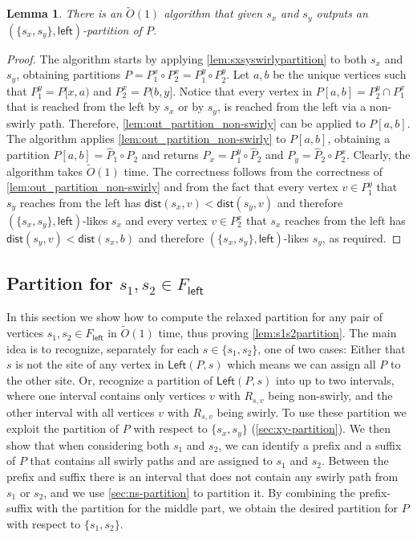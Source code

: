 \documentclass{article}
\newcommand{\Left}{\mathsf{Left}}
\newcommand{\leftside}{\mathsf{left}}
\newcommand{\dist}{\mathsf{dist}}
\newtheorem{lemma}{Lemma}
\newcommand{\Otild}{\tilde{O}}
\begin{document}
\begin{lemma}\label{lem:out_partition_xy}
    There is an $\Otild(1)$ algorithm that given $s_x$ and $s_y$ outputs an $(\{ s_x,s_y \},\leftside)$-partition of $P$.
\end{lemma}
\begin{proof}
    The algorithm starts by applying \cref{lem:sxsyswirlypartition} to both $s_x$ and $s_y$, obtaining partitions $P= P^x_1 \circ P^x_2 = P^y_1 \circ P^y_2$.
    Let $a,b$ be the unique vertices such that $P^y_1=P[x,a)$ and $P^x_2 = P(b,y]$.
    Notice that every vertex in $P[a,b]=P^y_2 \cap P^x_1$ that is reached from the left by $s_x$ or by $s_y$, is reached from the left via a non-swirly path.
    Therefore, \cref{lem:out_partition_non-swirly} can be applied to $P[a,b]$.
    The algorithm applies \cref{lem:out_partition_non-swirly} to $P[a,b]$, obtaining a partition $P[a,b] = \hat P_1 \circ \hat P_2$ and returns $P_x = P^y_1 \circ \hat P_2$
    and $P_y = \hat P_2 \circ P^x_2$.
    Clearly, the algorithm takes $\Otild(1)$ time.
    The correctness follows from the correctness of \cref{lem:out_partition_non-swirly} and from the fact that every vertex $v\in P^y_1$ that $s_y$ reaches from the left has $\dist(s_x,v) < \dist(s_y,v)$ and therefore $(\{s_x,s_y\},\leftside)$-likes $s_x$ and every vertex $v\in P^x_2$ that $s_x$ reaches from the left has $\dist(s_y,v) < \dist(s_x,b)$ and therefore $(\{s_x,s_y\},\leftside)$-likes $s_y$, as required.
\end{proof}




\subsection{Partition for $s_1,s_2\in F_{\leftside}$}\label{sec:two-partition}

In this section we show how to compute the relaxed partition for any pair of vertices $s_1,s_2\in F_{\leftside}$ in $\Otild(1)$ time, thus proving \cref{lem:s1s2partition}.
The main idea is to recognize, separately for each $s\in \{s_1,s_2\}$, one of two cases: Either that $s$ is not the site of any vertex in $\Left(P,s)$ which means we can assign all $P$ to the other site.
Or, recognize a partition of $\Left(P,s)$ into up to two intervals, where one interval contains only vertices $v$ with $R_{s,v}$ being non-swirly, and the other interval with all vertices $v$ with $R_{s,v}$  being swirly.
To use these partition we exploit the partition of $P$ with respect to $\{s_x,s_y\}$ (\cref{sec:xy-partition}).
We then show that when considering both $s_1$ and $s_2$, we can identify a prefix and a suffix of $P$ that contains all swirly paths and are assigned to $s_1$ and $s_2$.
Between the prefix and suffix there is an interval that does not contain any swirly path from $s_1$ or $s_2$, and we use \cref{sec:ns-partition} to partition it.
By combining the prefix-suffix with the partition for the middle part, we obtain the desired partition for $P$ with respect to $\{s_1,s_2\}$.
\end{document}
